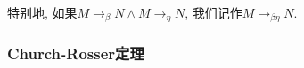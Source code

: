 \begin{definition}
    特别地, 如果$M\to_\beta N\land M\to_\eta N$, 我们记作$M\to_{\beta\eta}N$.
\end{definition}

\subsubsection{\textbf{Church-Rosser}定理}
